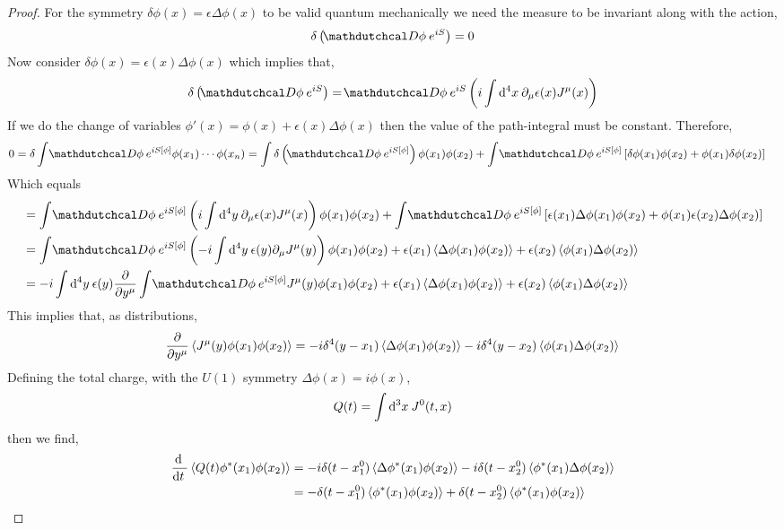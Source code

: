 \documentclass[12pt]{extarticle}
\begin{document}
\begin{proof}
For the symmetry $\delta \phi(x) = \epsilon \Delta \phi(x)$ to be valid quantum mechanically we need the measure to be invariant along with the action,
\[ \delta \left( \pathd{\phi} e^{i S} \right) = 0 \]
Now consider $\delta \phi(x) = \epsilon(x) \Delta \phi(x)$ which implies that,
\[ \delta \left( \pathd{\phi} e^{i S} \right) = \pathd{\phi} e^{i S} \left( i \int \dn{4}{x} \partial_{\mu} \epsilon(x) J^\mu(x) \right) \]
If we do the change of variables $\phi'(x) = \phi(x) + \epsilon(x) \Delta \phi(x)$ then the value of the path-integral must be constant. Therefore,
\begin{align*}
0 = \delta \int \pathd{\phi} e^{i S[\phi]} \phi(x_1) \cdots \phi(x_n) & = \int \delta \left( \pathd{\phi} e^{i S[\phi]} \right) \phi(x_1) \phi(x_2) + \int \pathd{\phi} e^{i S[\phi]} \left[ \delta \phi(x_1) \phi(x_2) + \phi(x_1) \delta \phi(x_2) \right]
\end{align*}
Which equals 
\begin{align*}
& = \int \pathd{\phi} e^{i S[\phi]} \left( i \int \dn{4}{y} \partial_\mu \epsilon(x) J^\mu(x) \right) \phi(x_1) \phi(x_2)
+ \int \pathd{\phi} e^{i S[\phi]} \left[ \epsilon(x_1) \Delta \phi(x_1) \phi(x_2) + \phi(x_1) \epsilon(x_2) \Delta\phi(x_2) \right]
\\
& = \int \pathd{\phi} e^{i S[\phi]} \left( -i \int \dn{4}{y} \epsilon(y) \partial_\mu J^\mu(y) \right) \phi(x_1) \phi(x_2)
+ \epsilon(x_1) \EV{\Delta \phi(x_1) \phi(x_2)} + \epsilon(x_2) \EV{\phi(x_1) \Delta \phi(x_2)}
\\
& =  -i \int \dn{4}{y} \epsilon(y) \pderiv{}{y^\mu} \int \pathd{\phi} e^{i S[\phi]} J^\mu(y) \phi(x_1) \phi(x_2)
+ \epsilon(x_1) \EV{\Delta \phi(x_1) \phi(x_2)} + \epsilon(x_2) \EV{\phi(x_1) \Delta \phi(x_2)}
\end{align*}
This implies that, as distributions,
\[ \frac{\partial{}}{\partial{y^\mu}} \left< J^\mu(y) \phi(x_1) \phi(x_2) \right> = - i \delta^4(y - x_1) \left< \Delta \phi(x_1) \phi(x_2) \right> - i \delta^4(y - x_2) \left< \phi(x_1) \Delta \phi(x_2) \right> \]
Defining the total charge, with the $U(1)$ symmetry $\Delta \phi(x) = i \phi(x)$,
\[ Q(t) = \int \mathrm{d}^{3} x \: J^0(t, x) \]
then we find,
\begin{align*}
\frac{\mathrm{d} \:}{\mathrm{d}t \:} \left< Q(t) \phi^*(x_1) \phi(x_2)  \right> & = - i \delta(t - x_1^0) \left< \Delta \phi^*(x_1) \phi(x_2)  \right> - i \delta(t - x_2^0) \left< \phi^*(x_1) \Delta \phi(x_2) \right> 
\\
& = - \delta(t - x_1^0) \left<  \phi^*(x_1) \phi(x_2)  \right> + \delta(t - x_2^0) \left< \phi^*(x_1) \phi(x_2) \right> 
\end{align*}
\end{proof}
\end{document}
